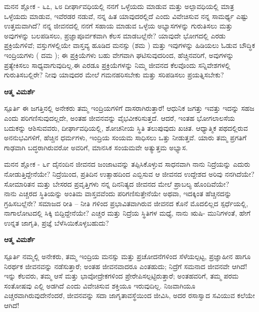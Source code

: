 \begin{mananam}{\mananamfont \large {ಮನನ ಶ್ಲೋಕ - ೬೭, ೬೮}}
\footnotesize \mananamtext ದೀರ್ಘಾವಧಿಯಲ್ಲಿ ನನಗೆ ಒಳ್ಳೆಯದು ಮಾಡುವ ಮತ್ತು ಅಲ್ಪಾವಧಿಯಲ್ಲಿ ಮಾತ್ರ ಒಳ್ಳೆಯದು ಮಾಡುವ,  ಇವೆರಡರ ನಡುವೆ, ನನ್ನ ಹಿತ ಯಾವುದರಲ್ಲಿದೆ ಎಂದು ವಿವೇಚಿಸುವ ನನ್ನ ಸಾಮರ್ಥ್ಯ ಎಷ್ಟು ಉತ್ತಮವಾಗಿದೆ? ನನ್ನ ಜೀವನದಲ್ಲಿ ನನಗೆ ಸಹಾಯ ಮಾಡುವ ಒಳ್ಳೆಯ ಅಭ್ಯಾಸಗಳನ್ನು ಗುರುತಿಸಲು ಮತ್ತು ಅವುಗಳನ್ನು ಬಲಪಡಿಸಲು,  ಪ್ರಜ್ಞಾಪೂರ್ವಕವಾಗಿ ಕೆಲಸ ಮಾಡಬಲ್ಲೆನೇ? 
 ಯಾವುದೇ ಭೋಗದಲ್ಲಿ ಎರಡು ಪ್ರಕ್ರಿಯೆಗಳಿವೆ; ವಸ್ತುಗಳಲ್ಲಿಯೇ ವಾಸ್ತವ್ಯ ಹೂಡಿದ  ಮನಸ್ಸು (ಶಮ ) ಮತ್ತು ಇವುಗಳನ್ನು ಹಿಡಿಯಲು ಓಡುವ  ಬೌದ್ಧಿಕ ಇಂದ್ರಿಯಗಳು ( ದಮ ); ಈ ಪ್ರಕ್ರಿಯೆಗಳು ಬಹು ವೇಗವಾಗಿ ಘಟಿಸುವುದರಿಂದ, ಹೆಚ್ಚಿನವರಿಗೆ, ಅವುಗಳನ್ನು ಪ್ರತ್ಯೇಕಿಸಲು ಸಾಧ್ಯವಾಗುವುದಿಲ್ಲ.ಈ ಎರಡೂ ಪ್ರಕ್ರಿಯೆಗಳನ್ನು ನಿಮ್ಮ ಜೀವನದ ಕೆಲವೊಂದು ಸನ್ನಿವೇಶಗಳಲ್ಲಿ ಗುರುತಿಸಬಲ್ಲಿರೇ? ನೀವು ಯಾವುದರ ಮೇಲೆ ಗಮನಹರಿಸಬೇಕು ಮತ್ತು ಸರಿಪಡಿಸಲು ಪ್ರಯತ್ನಿಸಬೇಕು?
\end{mananam}
\WritingHand\enspace\textbf{ಆತ್ಮ ವಿಮರ್ಶೆ}
\begin{inspiration}{\mananamfont \large ಸ್ಪೂರ್ತಿ}
\footnotesize \mananamtext ಈ ಜಗತ್ತಿನಲ್ಲಿ ಅನೇಕರು ತಮ್ಮ ಇಂದ್ರಿಯಗಳಿಗೆ ದಾಸರಾಗಿರುತ್ತಾರೆ! ಆಧುನಿಕ ಜಗತ್ತು ಇವತ್ತು ಇದನ್ನು ಸಹಜ ಎಂದು ಪರಿಗಣಿಸುವುದಲ್ಲದೇ, ಅಂತಹ ಜೀವನವನ್ನು ವೈಭವೀಕರಿಸುತ್ತದೆ. ಆದರೆ, ಇಂತಹ ಭೋಗಲಾಲಸೆಯ ಬದುಕನ್ನು ಆಶಿಸುವವರು, ದೀರ್ಘಾವಧಿಯಲ್ಲಿ, ಶೋಚನೀಯ ಸ್ಥಿತಿ ತಲುಪುವುದು ಖಚಿತ. ಆಧ್ಯಾತ್ಮಿಕ ಪಥದಲ್ಲಿರುವ ಅನನುಭವಿಗಳಿಗೆ, ಹೆಚ್ಚಿನ ಧರ್ಮಗಳು, ಇಂದ್ರಿಯ ಸಂಯಮ ಸಾಧಿಸಲು ಒತ್ತು ನೀಡುತ್ತವೆ. ಯಾರು ತಮ್ಮ ಪ್ರಗತಿಗೆ ಗಾಢವಾಗಿ ಬದ್ಧರಾಗಿರುವರೋ ಅವರಿಗೆ, ಮಾನಸಿಕ ಸಂಯಮವೇ ಅತ್ಯುತ್ತಮ ಅಭ್ಯಾಸ.
\end{inspiration}
\newpage

\begin{mananam}{\mananamfont \large ಮನನ ಶ್ಲೋಕ - ೬೯}
\footnotesize \mananamtext ದೈನಂದಿನ ಜೀವನದ ಜಂಜಾಟವನ್ನು ತಪ್ಪಿಸಿಕೊಳ್ಳುವ ಸಾಧನವಾಗಿ ನಾನು ನಿದ್ರೆಯನ್ನು ಎದುರು ನೋಡುತ್ತಿದ್ದೇನೆಯೇ? ನಿದ್ರೆಯಿಂದ, ಪ್ರತಿದಿನ ಉತ್ಸಾಹದಿಂದ ಎಬ್ಬಿಸುವ ಆ  ಜೀವನದ ಉದ್ದೇಶದ ಅರಿವು ನನಗಿದೆಯೇ?  ಸೋಮಾರಿತನ ಮತ್ತು ಬೇಸರದ ಪ್ರವೃತ್ತಿಗಳು ನನ್ನ ದಿನನಿತ್ಯದ ಜೀವನದ ಮೇಲೆ ಪ್ರಾಬಲ್ಯ ಹೊಂದಿವೆಯೇ?\\
ನಾನು ಎಚ್ಚರದ ಸ್ಥಿತಿಯನ್ನು ಅಂತಿಮ ವಾಸ್ತವವೆಂದು ಪರಿಗಣಿಸುತ್ತೇನೆಯೇ ಅಥವಾ, ಇದಕ್ಕಿಂತ ಹೆಚ್ಚಿನದನ್ನು ಗ್ರಹಿಸಬಲ್ಲೆನೇ? ಸಮಾಜದ ರೀತಿ – ನೀತಿ ಗಳಿಂದ ಪ್ರಭಾವಿತವಾಗಿರುವ ಜೀವನದ ಕೊನೆ ಮೊದಲಿಲ್ಲದ ಸ್ಪರ್ಧೆಯಲ್ಲಿ, ನಾಗಾಲೋಟದಲ್ಲಿ ಸಿಕ್ಕಿ ಬಿದ್ದಿದ್ದೇನೆಯೇ? ಎಚ್ಚರ ಮತ್ತು ನಿದ್ರೆಯ  ಸ್ಥಿತಿಗಳ  ಮಧ್ಯೆ,  ನಾನು ಋಷಿ- ಮುನಿಗಳಂತೆ,  ಹೇಗೆ ಉನ್ನತ ಜಾಗೃತಿ, ಪ್ರಜ್ಞೆ ಬೆಳೆಸಿಯಿಕೊಳ್ಳಬಹುದು?

\end{mananam}
\WritingHand\enspace\textbf{ಆತ್ಮ ವಿಮರ್ಶೆ}
\begin{inspiration}{\mananamfont \large ಸ್ಪೂರ್ತಿ}
\footnotesize \mananamtext ನಮ್ಮಲ್ಲಿ ಅನೇಕರು, ತಮ್ಮ ಇಂದ್ರಿಯ ಮನಸ್ಸು ಮತ್ತು ಪ್ರಚೋದನೆಗಳಿಂದ ಸೆಳೆಯಲ್ಪಟ್ಟ, ಪ್ರಜ್ಞಾಹೀನ ಹಾಗೂ ನಿರರ್ಥಕ   ಜೀವನವನ್ನು ನಡೆಸುತ್ತಾರೆ; ಅಂತಹ ಜೀವನವಾದರೂ ಎಂತಹುದು; ನಿದ್ರೆಗೆ ಸಮನಾದ ಜೀವನವೇ ಆಗಿದೆ! ಇನ್ನು ಕೆಲವರು, ತಮ್ಮ ಆಸೆ ಮತ್ತು ಭಾವೋದ್ರೇಕಗಳಿಂದ ಪ್ರೇರೇಪಿಸಲ್ಪಟ್ಟಿರುತ್ತಾರೆ; ಅಂತಹವರಿಗೆ, ತಮ್ಮ ಪರಮ ಸಂತೋಷವು ಎಲ್ಲಿ ಅಡಗಿದೆ ಎಂದು ವಿವೇಚಿಸುವ ಶಕ್ತಿಯೂ ಇರುವುದಿಲ್ಲ. ನಿಜವಾಗಿಯೂ ಎಚ್ಚರವಾಗಿರುವುದೇನೆಂದರೆ, ಜೀವನವನ್ನು ಸದಾ ಜಾಗೃತಾವಸ್ಥೆಯಿಂದ ಜೀವಿಸಿ, ಅದರ ರಸಾಸ್ವಾದ  ಸವಿಯುವ ಕಲೆಯೇ ಆಗಿದೆ!
\end{inspiration}

